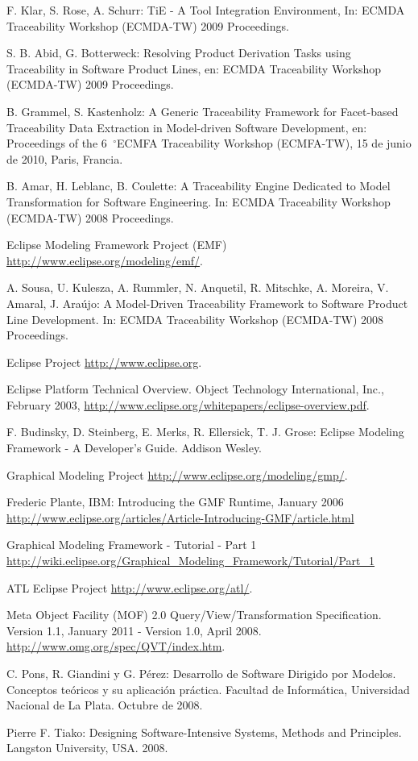\documentclass[a4paper,12pt,oneside,spanish]{book}
\newcommand{\grad}{\hspace{-2mm}$\phantom{a}^{\circ}$}
\begin{document}
\begin{thebibliography}{99}
 F. Klar, S. Rose, A. Schurr: TiE - A Tool Integration Environment, In: ECMDA Traceability Workshop (ECMDA-TW) 2009 Proceedings.

 S. B. Abid, G. Botterweck: Resolving Product Derivation Tasks using Traceability in Software Product Lines, en: ECMDA Traceability Workshop (ECMDA-TW) 2009 Proceedings.

 B. Grammel, S. Kastenholz: A Generic Traceability Framework for Facet-based Traceability Data Extraction in Model-driven Software Development, en: Proceedings of the 6\grad ECMFA Traceability Workshop (ECMFA-TW), 15 de junio de 2010, Paris, Francia.

 B. Amar, H. Leblanc, B. Coulette: A Traceability Engine Dedicated to Model Transformation for Software Engineering. In: ECMDA Traceability Workshop (ECMDA-TW) 2008 Proceedings.

 Eclipse Modeling Framework Project (EMF) \url{http://www.eclipse.org/modeling/emf/}.

 A. Sousa, U. Kulesza, A. Rummler, N. Anquetil, R. Mitschke, A. Moreira, V. Amaral, J. Araújo: A Model-Driven Traceability Framework to Software Product Line Development. In: ECMDA Traceability Workshop (ECMDA-TW) 2008 Proceedings.

 Eclipse Project \url{http://www.eclipse.org}.

 Eclipse Platform Technical Overview. Object Technology International, Inc., February 2003,
\url{http://www.eclipse.org/whitepapers/eclipse-overview.pdf}.

 F. Budinsky, D. Steinberg, E. Merks, R. Ellersick, T. J. Grose: Eclipse Modeling Framework - A Developer's Guide. Addison Wesley.

 Graphical Modeling Project \url{http://www.eclipse.org/modeling/gmp/}.

 Frederic Plante, IBM: Introducing the GMF Runtime, January 2006 \url{http://www.eclipse.org/articles/Article-Introducing-GMF/article.html}

 Graphical Modeling Framework - Tutorial - Part 1 \url{http://wiki.eclipse.org/Graphical_Modeling_Framework/Tutorial/Part_1}

 ATL Eclipse Project \url{http://www.eclipse.org/atl/}.

 Meta Object Facility (MOF) 2.0 Query/View/Transformation Specification. Version 1.1, January 2011 - Version 1.0, April 2008. \url{http://www.omg.org/spec/QVT/index.htm}.

 C. Pons, R. Giandini y G. Pérez: Desarrollo de Software Dirigido por Modelos. Conceptos teóricos y su aplicación práctica. Facultad de Informática, Universidad Nacional de La Plata. Octubre de 2008.

 Pierre F. Tiako: Designing Software-Intensive Systems, Methods and Principles. Langston University, USA. 2008.

\end{thebibliography}
\end{document}
